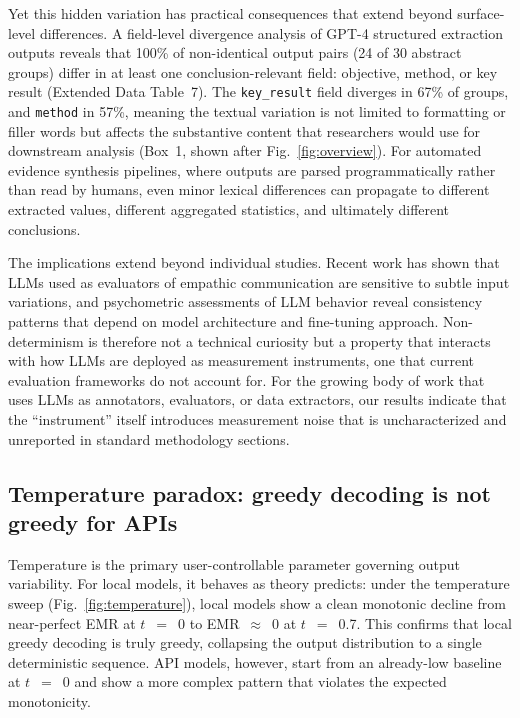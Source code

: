 \documentclass[sn-nature]{sn-jnl}
\begin{document}
Yet this hidden variation has practical consequences that extend beyond surface-level differences.
A field-level divergence analysis of GPT-4 structured extraction outputs reveals that 100\% of non-identical output pairs (24 of 30 abstract groups) differ in at least one conclusion-relevant field: objective, method, or key result (Extended Data Table~7).
The \texttt{key\_result} field diverges in 67\% of groups, and \texttt{method} in 57\%, meaning the textual variation is not limited to formatting or filler words but affects the substantive content that researchers would use for downstream analysis (Box~1, shown after Fig.~\ref{fig:overview}).
For automated evidence synthesis pipelines, where outputs are parsed programmatically rather than read by humans, even minor lexical differences can propagate to different extracted values, different aggregated statistics, and ultimately different conclusions.

The implications extend beyond individual studies.
Recent work has shown that LLMs used as evaluators of empathic communication are sensitive to subtle input variations\cite{kumar2026reliable}, and psychometric assessments of LLM behavior reveal consistency patterns that depend on model architecture and fine-tuning approach\cite{serapiogarcía2025psychometric}.
Non-determinism is therefore not a technical curiosity but a property that interacts with how LLMs are deployed as measurement instruments, one that current evaluation frameworks do not account for.
For the growing body of work that uses LLMs as annotators, evaluators, or data extractors, our results indicate that the ``instrument'' itself introduces measurement noise that is uncharacterized and unreported in standard methodology sections.


\subsection{Temperature paradox: greedy decoding is not greedy for APIs}\label{subsec:temperature}

Temperature is the primary user-controllable parameter governing output variability.
For local models, it behaves as theory predicts: under the temperature sweep (Fig.~\ref{fig:temperature}), local models show a clean monotonic decline from near-perfect EMR at $t$~$=$~0 to EMR~$\approx$~0 at $t$~$=$~0.7.
This confirms that local greedy decoding is truly greedy, collapsing the output distribution to a single deterministic sequence.
API models, however, start from an already-low baseline at $t$~$=$~0 and show a more complex pattern that violates the expected monotonicity.
\end{document}

